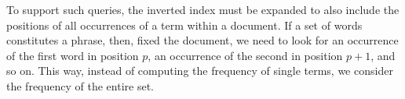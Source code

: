 To support such queries, the inverted index must be expanded to also include the positions of all occurrences of a term within a document. If a set of words constitutes a phrase, then, fixed the document, we need to look for an occurrence of the first word in position $p$, an occurrence of the second in position $p+1$, and so on. This way, instead of computing the frequency of single terms, we consider the frequency of the entire set.